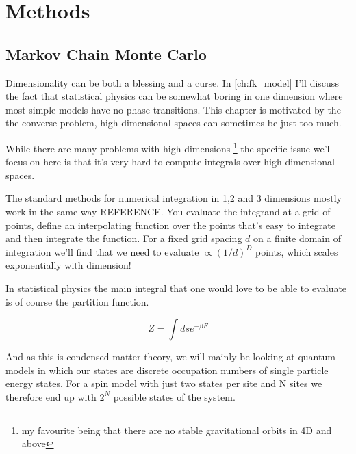 \section{Methods}
\subsection{Markov Chain Monte Carlo}
\label{sec:mcmc}

    	    

Dimensionality can be both a blessing and a curse. In \autoref{ch:fk_model} I'll discuss the fact that statistical physics can be somewhat boring in one dimension where most simple models have no phase transitions. This chapter is motivated by the the converse problem, high dimensional spaces can sometimes be just too much.

While there are many problems with high dimensions \footnote{my favourite being that there are no stable gravitational orbits in 4D and above} the specific issue we'll focus on here is that it's very hard to compute integrals over high dimensional spaces. 

The standard methods for numerical integration in 1,2 and 3 dimensions mostly work in the same way REFERENCE. You evaluate the integrand at a grid of points, define an interpolating function over the points that's easy to integrate and then integrate the function. For a fixed grid spacing $d$ on a finite domain of integration we'll find that we need to evaluate $\propto (1/d)^D$ points, which scales exponentially with dimension! 

In statistical physics the main integral that one would love to be able to evaluate is of course the partition function.

\[Z = \int ds e^{-\beta F}\]

And as this is condensed matter theory, we will mainly be looking at quantum models in which our states are discrete occupation numbers of single particle energy states. For a spin model with just two states per site and N sites we therefore end up with $2^N$ possible states of the system.



